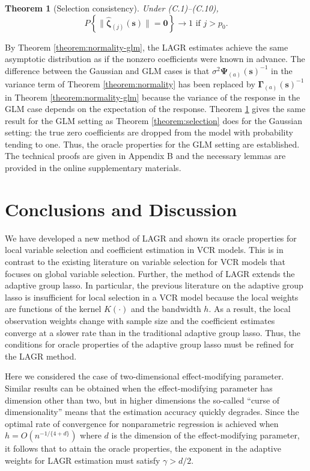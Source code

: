 \documentclass[authoryear,review, 12pt]{elsarticle}
\newtheorem{thm}{Theorem}
\begin{document}
\begin{thm}[Selection consistency]
\label{theorem:selection-glm}  Under (C.1)--(C.10),
\[
P\left\{ \|\hat{\bm{\zeta}}_{(j)}(\bm{s})\|=\bm{0}\right\} \to1\text{ if }j>p_{0}.
\]
 
\end{thm}
By Theorem \ref{theorem:normality-glm}, the LAGR estimates achieve
the same asymptotic distribution as if the nonzero coefficients were
known in advance. The difference between the Gaussian and GLM cases
is that $\sigma^{2}\bm{\Psi}_{(a)}(\bm{s})^{-1}$ in the variance
term of Theorem \ref{theorem:normality} has been replaced by $\bm{\Gamma}_{(a)}(\bm{s})^{-1}$
in Theorem \ref{theorem:normality-glm} because the variance of the
response in the GLM case depends on the expectation of the response.
Theorem \ref{theorem:selection-glm} gives the same result for the
GLM setting as Theorem \ref{theorem:selection} does for the Gaussian
setting: the true zero coefficients are dropped from the model with
probability tending to one. Thus, the oracle properties for the GLM
setting are established. The technical proofs are given in Appendix
B and the necessary lemmas are provided in the online supplementary
materials.


\section{Conclusions and Discussion}

We have developed a new method of LAGR and shown its oracle properties
for local variable selection and coefficient estimation in VCR models.
This is in contrast to the existing literature on variable selection
for VCR models that focuses on global variable selection. Further,
the method of LAGR extends the adaptive group lasso. In particular,
the previous literature on the adaptive group lasso is insufficient
for local selection in a VCR model because the local weights are functions
of the kernel $K(\cdot)$ and the bandwidth $h$. As a result, the
local observation weights change with sample size and the coefficient
estimates converge at a slower rate than in the traditional adaptive
group lasso. Thus, the conditions for oracle properties of the adaptive
group lasso must be refined for the LAGR method.

Here we considered the case of two-dimensional effect-modifying parameter.
Similar results can be obtained when the effect-modifying parameter
has dimension other than two, but in higher dimensions the so-called
``curse of dimensionality'' means that the estimation accuracy quickly
degrades. Since the optimal rate of convergence for nonparametric
regression is achieved when $h=O\left(n^{-1/\{4+d\}}\right)$ where
$d$ is the dimension of the effect-modifying parameter, it follows
that to attain the oracle properties, the exponent in the adaptive
weights for LAGR estimation must satisfy $\gamma>d/2$.
\end{document}
